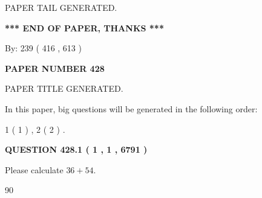 \documentclass[12pt]{article}
\begin{document}
   
   
   
   
   
 \vspace{0.2in}
 
   
   
\vspace{2.0in} PAPER TAIL GENERATED.
   
   
   
   
\vspace{1.0in} 
{\textbf{\large{ *** END OF PAPER, THANKS *** }}} 
   
   
\hspace{1.0in} By: 
 239 ( 416 ,  613 )
   
   
   
   
\newpage 
\setcounter{page}{ 
   428001 } 
   
   
   
   
 {\textbf{ \Large{ PAPER NUMBER  428  }}}
   
   
\vspace{0.2in}
   
   
   
   
   
   
   
   
 \vspace{0.2in}
 
 
 
 
   
   
 PAPER TITLE GENERATED.
   
   
   
\vspace{0.2in}
   
In this paper, big questions will be generated in the following order: 
   
   
   1 ( 1 )
 ,
   2 ( 2 )
 .
  
\vspace{0.2in}
  
{\textbf{\Large{QUESTION
428.1 
 ( 1 , 1 , 6791 )
}}}
  
  
 
Please calculate $ %
36 +  %
54 $.
 
 
 
\noindent{}
 
 

90
 
 
\noindent{}
 
\end{document}
